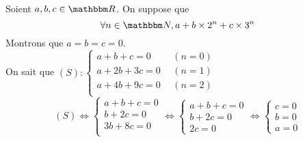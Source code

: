 \begin{exm}
	Soient $a,b,c \in \R$.
	On suppose que \[
		\forall n \in \N, a + b \times 2^n + c \times 3^n
	\] Montrons que $a = b= c = 0$.\\
	On sait que $(S): \begin{cases}
		a+b+c=0 &~~(n=0)\\
		a+2b+3c=0 &~~(n=1)\\
		a+4b+9c=0 &~~(n=2)\\
	\end{cases}$\\
	\[
		(S) \iff
		\begin{cases}
			a + b + c = 0\\
			b+2c = 0\\
			3b + 8c=0\\
		\end{cases} \iff
		\begin{cases}
			a+b+c = 0\\
			b+2c = 0\\
			2c = 0
		\end{cases}\iff
		\begin{cases}
			c=0\\
			b=0\\
			a=0
		\end{cases}
	\] 
\end{exm}

